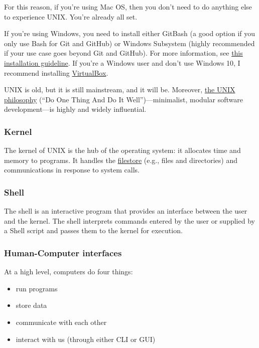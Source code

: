\documentclass[
  letterpaper,
  DIV=11,
  numbers=noendperiod]{scrreprt}
\providecommand{\tightlist}{%
  \setlength{\itemsep}{0pt}\setlength{\parskip}{0pt}}\usepackage{longtable,booktabs,array}
\begin{document}
For this reason, if you're using Mac OS, then you don't need to do
anything else to experience UNIX. You're already all set.

If you're using Windows, you need to install either GitBash (a good
option if you only use Bash for Git and GitHub) or Windows Subsystem
(highly recommended if your use case goes beyond Git and GitHub). For
more information, see
\href{https://github.com/cjbarrie/CS-ED/blob/main/other/setup.md}{this
installation guideline}. If you're a Windows user and don't use Windows
10, I recommend installing
\href{https://www.virtualbox.org/}{VirtualBox}.

UNIX is old, but it is still mainstream, and it will be. Moreover,
\href{https://en.wikipedia.org/wiki/Unix_philosophy}{the UNIX
philosophy} (``Do One Thing And Do It Well'')---minimalist, modular
software development---is highly and widely influential.

\hypertarget{kernel}{%
\subsubsection*{Kernel}\label{kernel}}

The kernel of UNIX is the hub of the operating system: it allocates time
and memory to programs. It handles the
\href{http://users.ox.ac.uk/~martinw/unix/chap3.html}{filestore} (e.g.,
files and directories) and communications in response to system calls.

\hypertarget{shell}{%
\subsubsection*{Shell}\label{shell}}

The shell is an interactive program that provides an interface between
the user and the kernel. The shell interprets commands entered by the
user or supplied by a Shell script and passes them to the kernel for
execution.

\hypertarget{human-computer-interfaces}{%
\subsubsection*{Human-Computer
interfaces}\label{human-computer-interfaces}}

At a high level, computers do four things:

\begin{itemize}
\tightlist
\item
  run programs
\item
  store data
\item
  communicate with each other
\item
  interact with us (through either CLI or GUI)
\end{itemize}
\end{document}
